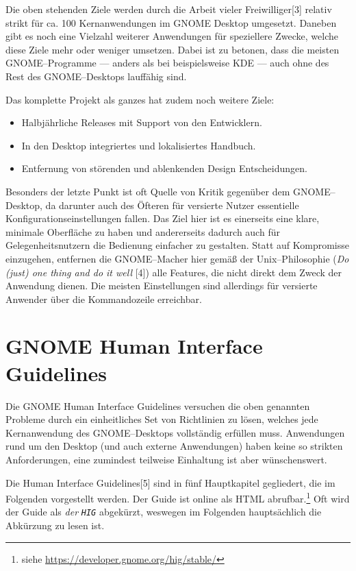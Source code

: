 \documentclass[11pt,ngerman,toc=listof,index=totoc]{scrreprt}
\providecommand{\tightlist}{%
  \setlength{\itemsep}{0pt}\setlength{\parskip}{0pt}}
\begin{document}
Die oben stehenden Ziele werden durch die Arbeit vieler
Freiwilliger{[}3{]} relativ strikt für ca. 100 Kernanwendungen im GNOME
Desktop umgesetzt. Daneben gibt es noch eine Vielzahl weiterer
Anwendungen für speziellere Zwecke, welche diese Ziele mehr oder weniger
umsetzen. Dabei ist zu betonen, dass die meisten GNOME--Programme ---
anders als bei beispielsweise KDE --- auch ohne des Rest des
GNOME--Desktops lauffähig sind.

Das komplette Projekt als ganzes hat zudem noch weitere Ziele:

\begin{itemize}
\tightlist
\item
  Halbjährliche Releases mit Support von den Entwicklern.
\item
  In den Desktop integriertes und lokalisiertes Handbuch.
\item
  Entfernung von störenden und ablenkenden Design Entscheidungen.
\end{itemize}

Besonders der letzte Punkt ist oft Quelle von Kritik gegenüber dem
GNOME--Desktop, da darunter auch des Öfteren für versierte Nutzer
essentielle Konfigurationseinstellungen fallen. Das Ziel hier ist es
einerseits eine klare, minimale Oberfläche zu haben und andererseits
dadurch auch für Gelegenheitsnutzern die Bedienung einfacher zu
gestalten. Statt auf Kompromisse einzugehen, entfernen die GNOME--Macher
hier gemäß der Unix--Philosophie (\emph{Do (just) one thing and do it
well} {[}4{]}) alle Features, die nicht direkt dem Zweck der Anwendung
dienen. Die meisten Einstellungen sind allerdings für versierte Anwender
über die Kommandozeile erreichbar.

\chapter{GNOME Human Interface
Guidelines}\label{gnome-human-interface-guidelines}

Die GNOME Human Interface Guidelines versuchen die oben genannten
Probleme durch ein einheitliches Set von Richtlinien zu lösen, welches
jede Kernanwendung des GNOME--Desktops vollständig erfüllen muss.
Anwendungen rund um den Desktop (und auch externe Anwendungen) haben
keine so strikten Anforderungen, eine zumindest teilweise Einhaltung ist
aber wünschenswert.

Die Human Interface Guidelines{[}5{]} sind in fünf Hauptkapitel
gegliedert, die im Folgenden vorgestellt werden. Der Guide ist online
als HTML abrufbar.\footnote{siehe
  \url{https://developer.gnome.org/hig/stable/}} Oft wird der Guide als
\emph{der} \emph{\texttt{HIG}} abgekürzt, weswegen im Folgenden
hauptsächlich die Abkürzung zu lesen ist.
\end{document}

